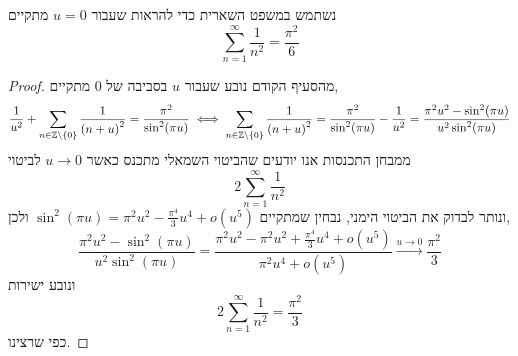 \subquestion{}
נשתמש במשפט השארית כדי להראות שעבור $u = 0$ מתקיים
\[
	\sum_{n = 1}^{\infty} \frac{1}{n^2} = \frac{\pi^2}{6}
\]
\begin{proof}
	מהסעיף הקודם נובע שעבור $u$ בסביבה של $0$ מתקיים,
	\[
		\frac{1}{u^2} + \sum_{n \in \mathbb{Z} \setminus \{ 0 \}} \frac{1}{{(n + u)}^2}
		= \frac{\pi^2}{\sin^2(\pi u)}
		\iff
		\sum_{n \in \mathbb{Z} \setminus \{ 0 \}} \frac{1}{{(n + u)}^2}
		= \frac{\pi^2}{\sin^2(\pi u)} - \frac{1}{u^2}
		= \frac{\pi^2 u^2 - \sin^2(\pi u)}{u^2 \sin^2(\pi u)}
	\]
	ממבחן התכנסות אנו יודעים שהביטוי השמאלי מתכנס כאשר $u \to 0$ לביטוי
	\[
		2 \sum_{n = 1}^{\infty} \frac{1}{n^2}
	\]
	ונותר לבדוק את הביטוי הימני, נבחין שמתקיים $\sin^2(\pi u) = \pi^2 u^2 - \frac{\pi^4}{3} u^4 + o(u^5)$ ולכן,
	\[
		\frac{\pi^2 u^2 - \sin^2(\pi u)}{u^2 \sin^2(\pi u)}
		= \frac{\pi^2 u^2 - \pi^2 u^2 + \frac{\pi^4}{3} u^4 + o(u^5)}{\pi^2 u^4 + o(u^5)}
		\xrightarrow{u \to 0} \frac{\pi^2}{3}
	\]
	ונובע ישירות
	\[
		2 \sum_{n = 1}^{\infty} \frac{1}{n^2}
		= \frac{\pi^2}{3}
	\]
	כפי שרצינו.
\end{proof}

